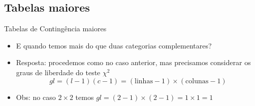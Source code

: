 \documentclass{beamer}
\begin{document}
\subsection{Tabelas maiores}

\begin{frame}{Tabelas de Contingência maiores}
  \begin{itemize}
  \item E quando temos mais do que duas categorias complementares?
  \item Resposta: procedemos como no caso anterior, mas precisamos
    considerar os \alert{graus de liberdade} do teste $\chi^2$
    \begin{displaymath}
        gl = (l-1)(c-1) = (\text{linhas} -1)\times (\text{colunas}-1)
    \end{displaymath}
  \item Obs: no caso $2 \times 2$ temos $gl = (2-1) \times (2-1)=1
    \times 1 = 1$
  \end{itemize}
\end{frame}




\end{document}
